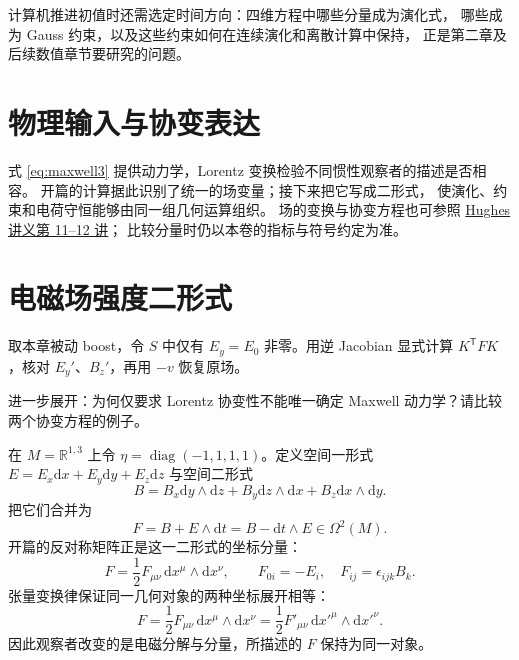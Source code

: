 \documentclass[UTF8,11pt,openany]{ctexbook}
\numberwithin{equation}{chapter}
\theoremstyle{definition}
\theoremstyle{remark}
\newcommand{\dd}{\mathrm d}
\newcommand{\RR}{\mathbb R}
\begin{document}
计算机推进初值时还需选定时间方向：四维方程中哪些分量成为演化式，
哪些成为 Gauss 约束，以及这些约束如何在连续演化和离散计算中保持，
正是第二章及后续数值章节要研究的问题。

\section{物理输入与协变表达}
式 \eqref{eq:maxwell3} 提供动力学，Lorentz 变换检验不同惯性观察者的描述是否相容。
开篇的计算据此识别了统一的场变量；接下来把它写成二形式，
使演化、约束和电荷守恒能够由同一组几何运算组织。
场的变换与协变方程也可参照
\href{https://ocw.mit.edu/courses/8-033-introduction-to-relativity-and-spacetime-physics-fall-2024/mit8_033_f24_lec_full.pdf}{Hughes 讲义第 11--12 讲}；
比较分量时仍以本卷的指标与符号约定为准。

\section{电磁场强度二形式}
\begin{askai}
取本章被动 boost，令 $S$ 中仅有 $E_y=E_0$ 非零。用逆 Jacobian
显式计算 $K^{\mathsf T}FK$，核对 $E_y'$、$B_z'$，再用 $-v$ 恢复原场。

进一步展开：为何仅要求 Lorentz 协变性不能唯一确定 Maxwell 动力学？请比较两个协变方程的例子。
\end{askai}
在 $M=\RR^{1,3}$ 上令 $\eta=\operatorname{diag}(-1,1,1,1)$。定义空间一形式 $E=E_x\dd x+E_y\dd y+E_z\dd z$ 与空间二形式
\begin{equation}
B=B_x\dd y\wedge\dd z+B_y\dd z\wedge\dd x+B_z\dd x\wedge\dd y.
\end{equation}
把它们合并为
\begin{equation}\label{eq:defF}
\boxed{F=B+E\wedge\dd t=B-\dd t\wedge E\in\Omega^2(M).}
\end{equation}
开篇的反对称矩阵正是这一二形式的坐标分量：
\begin{equation}
F=\frac12F_{\mu\nu}\,\dd x^\mu\wedge\dd x^\nu,\qquad
F_{0i}=-E_i,\quad F_{ij}=\epsilon_{ijk}B_k.
\end{equation}
张量变换律保证同一几何对象的两种坐标展开相等：
\begin{equation}
F=\frac12F_{\mu\nu}\,\dd x^\mu\wedge\dd x^\nu
=\frac12F'_{\mu\nu}\,\dd x'^\mu\wedge\dd x'^\nu.
\end{equation}
因此观察者改变的是电磁分解与分量，所描述的 $F$ 保持为同一对象。
\end{document}
